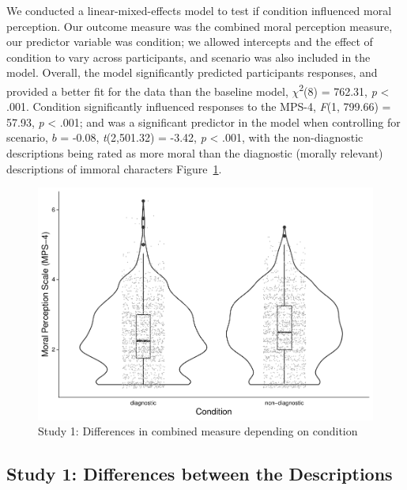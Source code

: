 \documentclass[
  american,
  man,floatsintext]{apa7}
\begin{document}
We conducted a linear-mixed-effects model to test if condition influenced moral perception. Our outcome measure was the combined moral perception measure, our predictor variable was condition; we allowed intercepts and the effect of condition to vary across participants, and scenario was also included in the model.
Overall, the model significantly predicted participants responses, and provided a better fit for the data than the baseline model, \(\chi\)\textsuperscript{2}(8) = 762.31, \emph{p} \textless{} .001. Condition significantly influenced responses to the MPS-4, \emph{F}(1, 799.66) = 57.93, \emph{p} \textless{} .001; and was a significant predictor in the model when controlling for scenario, \(b\) = -0.08, \emph{t}(2,501.32) = -3.42, \emph{p} \textless{} .001, with the non-diagnostic descriptions being rated as more moral than the diagnostic (morally relevant) descriptions of immoral characters Figure~\ref{fig:S1combinedconditionplot}.

\begin{figure}[!h]
\includegraphics[width=\textwidth,]{Supplementary_files/figure-latex/S1combinedconditionplot-1} \caption{Study 1: Differences in combined measure depending on condition}\label{fig:S1combinedconditionplot}
\end{figure}

\hypertarget{study-1-differences-between-the-descriptions}{%
\subsection{Study 1: Differences between the Descriptions}\label{study-1-differences-between-the-descriptions}}
\end{document}
